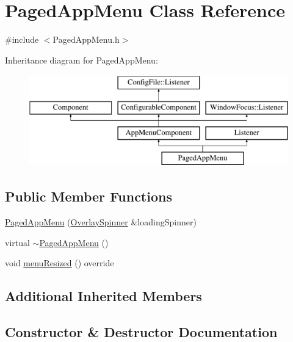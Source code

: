\hypertarget{classPagedAppMenu}{}\section{Paged\+App\+Menu Class Reference}
\label{classPagedAppMenu}


{\ttfamily \#include $<$Paged\+App\+Menu.\+h$>$}

Inheritance diagram for Paged\+App\+Menu\+:\begin{figure}[H]
\begin{center}
\leavevmode
\includegraphics[height=4.000000cm]{classPagedAppMenu}
\end{center}
\end{figure}
\subsection*{Public Member Functions}
\begin{DoxyCompactItemize}
\item 
\mbox{\hyperlink{classPagedAppMenu_a8ae0a867a93ea88b149271773c8d0bda}{Paged\+App\+Menu}} (\mbox{\hyperlink{classOverlaySpinner}{Overlay\+Spinner}} \&loading\+Spinner)
\item 
virtual \mbox{\hyperlink{classPagedAppMenu_a99aef92443ae80e288041593a23205de}{$\sim$\+Paged\+App\+Menu}} ()
\item 
void \mbox{\hyperlink{classPagedAppMenu_a1f79e778c41331eda6ed158448dc14e7}{menu\+Resized}} () override
\end{DoxyCompactItemize}
\subsection*{Additional Inherited Members}


\subsection{Constructor \& Destructor Documentation}
\mbox{\label{classPagedAppMenu_a8ae0a867a93ea88b149271773c8d0bda}} 
